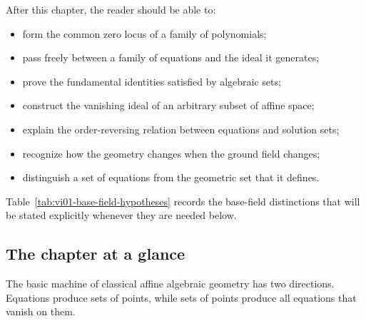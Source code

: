 After this chapter, the reader should be able to:
\begin{itemize}
  \item form the common zero locus of a family of polynomials;
  \item pass freely between a family of equations and the ideal it generates;
  \item prove the fundamental identities satisfied by algebraic sets;
  \item construct the vanishing ideal of an arbitrary subset of affine space;
  \item explain the order-reversing relation between equations and solution sets;
  \item recognize how the geometry changes when the ground field changes;
  \item distinguish a set of equations from the geometric set that it defines.
\end{itemize}

Table~\ref{tab:vi01-base-field-hypotheses} records the base-field distinctions
that will be stated explicitly whenever they are needed below.


\subsection*{The chapter at a glance}

The basic machine of classical affine algebraic geometry has two directions.  Equations
produce sets of points, while sets of points produce all equations that vanish on them.

\begin{center}
\end{center}

